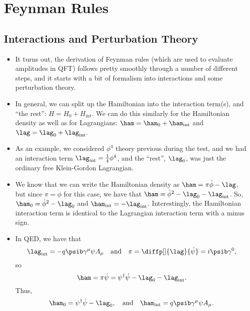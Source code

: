 \section{Feynman Rules}
\subsection*{Interactions and Perturbation Theory}

\newcommand{\hint}{H_{\mathrm{int}}}
\newcommand{\hamint}{\ham_{\mathrm{int}}}
\newcommand{\lagint}{\lag_{\mathrm{int}}}
\begin{itemize}
    \item It turns out, the derivation of Feynman rules (which are used to evaluate amplitudes in QFT) follows pretty smoothly through a number of different steps, and it starts with a bit of formalism into interactions and some perturbation theory.
    \item In general, we can split up the Hamiltonian into the interaction term(s), and ``the rest'': $H = H_0 + \hint$. We can do this similarly for the Hamiltonian density as well as for Lagrangians: $\ham = \ham_0 + \hamint$ and $\lag = \lag_0 + \lagint$.
    \item As an example, we considered $\phi^4$ theory previous during the test, and we had an interaction term $\lagint = \frac{1}{4}\phi^4$, and the ``rest'', $\lag_0$, was just the ordinary free Klein-Gordon Lagrangian.
    \item We know that we can write the Hamiltonian density as $\ham = \pi\dot{\phi} - \lag$, but since $\pi = \dot{\phi}$ for this case, we have that $\ham = \dot{\phi}^2 - \lag_0 - \lagint$. So, $\ham_0 = \dot{\phi}^2 - \lag_0$ and $\hamint = -\lagint$. Interestingly, the Hamiltonian interaction term is identical to the Lagrangian interaction term with a minus sign.
    \item In QED, we have that 
        \begin{equation*}
            \lagint = -q \psib\gamma^{\mu}\psi A_{\mu} \quad \mathrm{and} \quad \pi = \diffp[]{\lag}{\dot{\psi}} = i\psib \gamma^0,
        \end{equation*}
        so
        \begin{equation*}
            \ham = \pi \dot{\psi} = \psi^{\dagger} \dot{\psi} - \lag_0 - \lagint.
        \end{equation*}
        Thus,
        \begin{equation*}
            \ham_0 = \psi^{\dagger}\dot{\psi} - \lag_0, \quad \mathrm{and} \quad \hamint = q \psib\gamma^{\mu}\psi A_{\mu}.
        \end{equation*}
\end{itemize}

